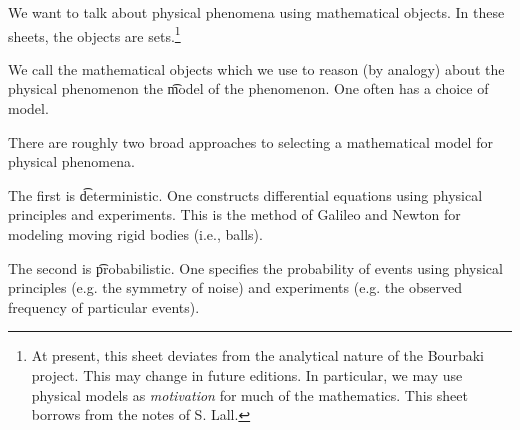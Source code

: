 

We want to talk about physical phenomena using mathematical objects.
In these sheets, the objects are sets.\footnote{At present, this sheet deviates from the analytical nature of the Bourbaki project. This may change in future editions. In particular, we may use physical models as \textit{motivation} for much of the mathematics. This sheet borrows from the notes of S. Lall.}


We call the mathematical objects which we use to reason (by analogy) about the physical phenomenon the \t{model} of the phenomenon.
One often has a choice of model.


There are roughly two broad approaches to selecting a mathematical model for physical phenomena.

The first is \t{deterministic}.
One constructs differential equations using physical principles and experiments.
This is the method of Galileo and Newton for modeling moving rigid bodies (i.e., balls).

The second is \t{probabilistic}.
One specifies the probability of events using physical principles (e.g. the symmetry of noise) and experiments (e.g. the observed frequency of particular events).

\blankpage
